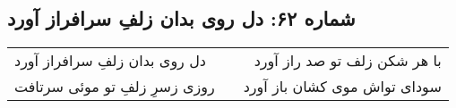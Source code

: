\begin{center}
\section*{شماره ۶۲: دل روی بدان زلفِ سرافراز آورد}
\label{sec:062}
\begin{longtable}{l p{0.5cm} r}
دل روی بدان زلفِ سرافراز آورد
&&
با هر شکن زلف تو صد راز آورد
\\
روزی زسرِ زلفِ تو موئی سرتافت
&&
سودای تواش موی کشان باز آورد
\\
\end{longtable}
\end{center}
